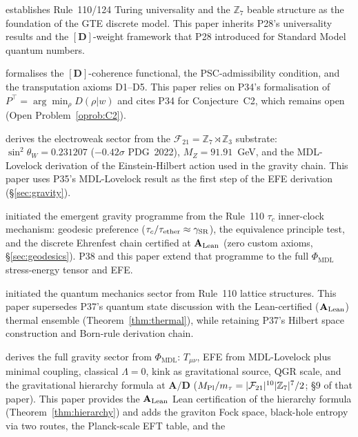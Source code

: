 \documentclass[11pt]{article}
\theoremstyle{remark}
\newcommand{\PHIMDL}{\Phi_{\mathrm{MDL}}}
\newcommand{\ZS}{\mathbb{Z}_7}
\newcommand{\ZZ}{\mathbb{Z}}
\newcommand{\FTT}{\mathcal{F}_{21}}
\newcommand{\CatAL}{\ensuremath{\textbf{A}_{\rm Lean}}}
\newcommand{\CatAD}{\textbf{A/D}}
\begin{document}
\begin{description}[noitemsep]
\item[P28~\cite{SpivackCompUniversality}] establishes Rule~110/124 Turing
  universality and the $\ZS$ beable structure as the foundation of the GTE
  discrete model.  This paper inherits P28's universality results and the
  $[\mathbf{D}]$-weight framework that P28 introduced for Standard Model
  quantum numbers.
\item[P34~\cite{SpivackGTEMobius}] formalises the $[\mathbf{D}]$-coherence
  functional, the PSC-admissibility condition, and the transputation axioms
  D1--D5.  This paper relies on P34's formalisation of $P^\top =
  \arg\min_\rho D(\rho|w)$ and cites P34 for Conjecture~C2, which remains
  open (Open Problem~\ref{oprob:C2}).
\item[P35~\cite{SpivackGTEUnification}] derives the electroweak sector from the
  $\FTT = \ZS\rtimes\ZZ_3$ substrate: $\sin^2\theta_W = 0.231207$ ($-0.42\sigma$ PDG~2022),
  $M_Z = 91.91$~GeV, and the MDL-Lovelock derivation of the Einstein-Hilbert
  action used in the gravity chain.  This paper uses P35's MDL-Lovelock result
  as the first step of the EFE derivation (\S\ref{sec:gravity}).
\item[P36~\cite{SpivackEmergentGravity}] initiated the emergent gravity programme
  from the Rule~110 $\tau_c$ inner-clock mechanism: geodesic preference
  ($\tau_c/\tau_{\rm ether}\approx\gamma_{\rm SR}$), the equivalence principle
  test, and the discrete Ehrenfest chain certified at $\CatAL$
  (zero custom axioms, \S\ref{sec:geodesics}).  P38 and this paper extend that
  programme to the full $\PHIMDL$ stress-energy tensor and EFE.
\item[P37~\cite{SpivackQMFromR110}] initiated the quantum mechanics sector from
  Rule~110 lattice structures.  This paper supersedes P37's quantum state
  discussion with the Lean-certified ($\CatAL$) thermal ensemble (Theorem~\ref{thm:thermal}),
  while retaining P37's Hilbert space construction and Born-rule derivation chain.
\item[P38~\cite{SpivackPhiMDLGravity}] derives the full gravity sector from $\PHIMDL$:
  $T_{\mu\nu}$, EFE from MDL-Lovelock plus minimal coupling, classical $\Lambda=0$,
  kink as gravitational source, QGR scale, and the gravitational hierarchy formula
  at $\CatAD$ ($M_{\rm Pl}/m_\tau = |\FTT|^{10}|\ZS|^7/2$; \S9 of that paper).
  This paper provides the $\CatAL$ Lean certification of the hierarchy formula
  (Theorem~\ref{thm:hierarchy}) and adds the graviton Fock space,
  black-hole entropy via two routes, the Planck-scale EFT table, and the

\end{description}
\end{document}
